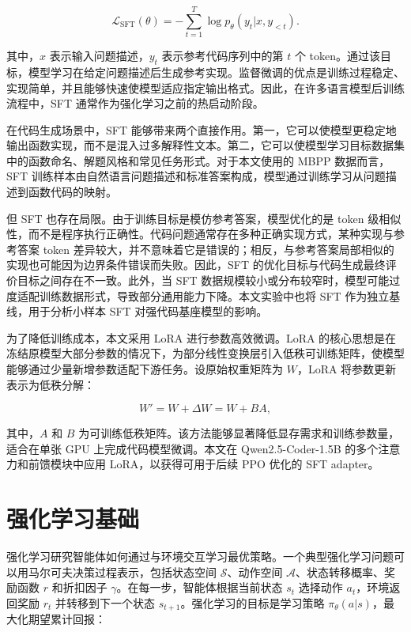 \begin{equation}
  \mathcal{L}_{\mathrm{SFT}}(\theta)
  = -\sum_{t=1}^{T}\log p_{\theta}(y_t|x,y_{<t}).
\end{equation}

其中，$x$ 表示输入问题描述，$y_t$ 表示参考代码序列中的第 $t$ 个 token。通过该目标，模型学习在给定问题描述后生成参考实现。监督微调的优点是训练过程稳定、实现简单，并且能够快速使模型适应指定输出格式。因此，在许多语言模型后训练流程中，SFT 通常作为强化学习之前的热启动阶段。

在代码生成场景中，SFT 能够带来两个直接作用。第一，它可以使模型更稳定地输出函数实现，而不是混入过多解释性文本。第二，它可以使模型学习目标数据集中的函数命名、解题风格和常见任务形式。对于本文使用的 MBPP 数据而言，SFT 训练样本由自然语言问题描述和标准答案构成，模型通过训练学习从问题描述到函数代码的映射。

但 SFT 也存在局限。由于训练目标是模仿参考答案，模型优化的是 token 级相似性，而不是程序执行正确性。代码问题通常存在多种正确实现方式，某种实现与参考答案 token 差异较大，并不意味着它是错误的；相反，与参考答案局部相似的实现也可能因为边界条件错误而失败。因此，SFT 的优化目标与代码生成最终评价目标之间存在不一致。此外，当 SFT 数据规模较小或分布较窄时，模型可能过度适配训练数据形式，导致部分通用能力下降。本文实验中也将 SFT 作为独立基线，用于分析小样本 SFT 对强代码基座模型的影响。

为了降低训练成本，本文采用 LoRA 进行参数高效微调。LoRA 的核心思想是在冻结原模型大部分参数的情况下，为部分线性变换层引入低秩可训练矩阵，使模型能够通过少量新增参数适配下游任务。设原始权重矩阵为 $W$，LoRA 将参数更新表示为低秩分解：

\begin{equation}
  W' = W + \Delta W = W + BA,
\end{equation}

其中，$A$ 和 $B$ 为可训练低秩矩阵。该方法能够显著降低显存需求和训练参数量，适合在单张 GPU 上完成代码模型微调。本文在 Qwen2.5-Coder-1.5B 的多个注意力和前馈模块中应用 LoRA，以获得可用于后续 PPO 优化的 SFT adapter。

\section{强化学习基础}

强化学习研究智能体如何通过与环境交互学习最优策略。一个典型强化学习问题可以用马尔可夫决策过程表示，包括状态空间 $\mathcal{S}$、动作空间 $\mathcal{A}$、状态转移概率、奖励函数 $r$ 和折扣因子 $\gamma$。在每一步，智能体根据当前状态 $s_t$ 选择动作 $a_t$，环境返回奖励 $r_t$ 并转移到下一个状态 $s_{t+1}$。强化学习的目标是学习策略 $\pi_{\theta}(a|s)$，最大化期望累计回报：

